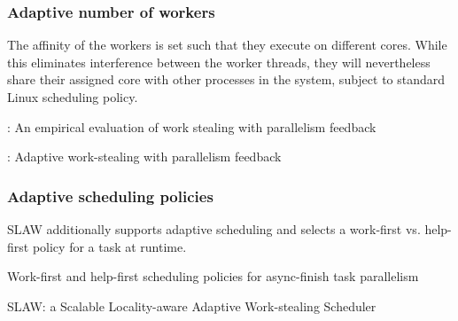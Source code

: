 \subsubsection{Adaptive number of workers}

The affinity of the workers is set such that they execute on different
cores. While this eliminates interference between the worker threads,
they will nevertheless share their assigned core with other processes
in the system, subject to standard Linux scheduling policy. 

\textcite{Agrawal2006}: An empirical evaluation of work stealing with
parallelism feedback

\textcite{Agrawal2007}: Adaptive work-stealing with parallelism
feedback

\subsubsection{Adaptive scheduling policies}

SLAW additionally supports adaptive scheduling and selects a
work-first vs. help-first policy for a task at runtime.

\textcite{Guo2009} Work-first and help-first scheduling policies for
async-finish task parallelism

\textcite{Guo2010} SLAW: a Scalable Locality-aware Adaptive
Work-stealing Scheduler




